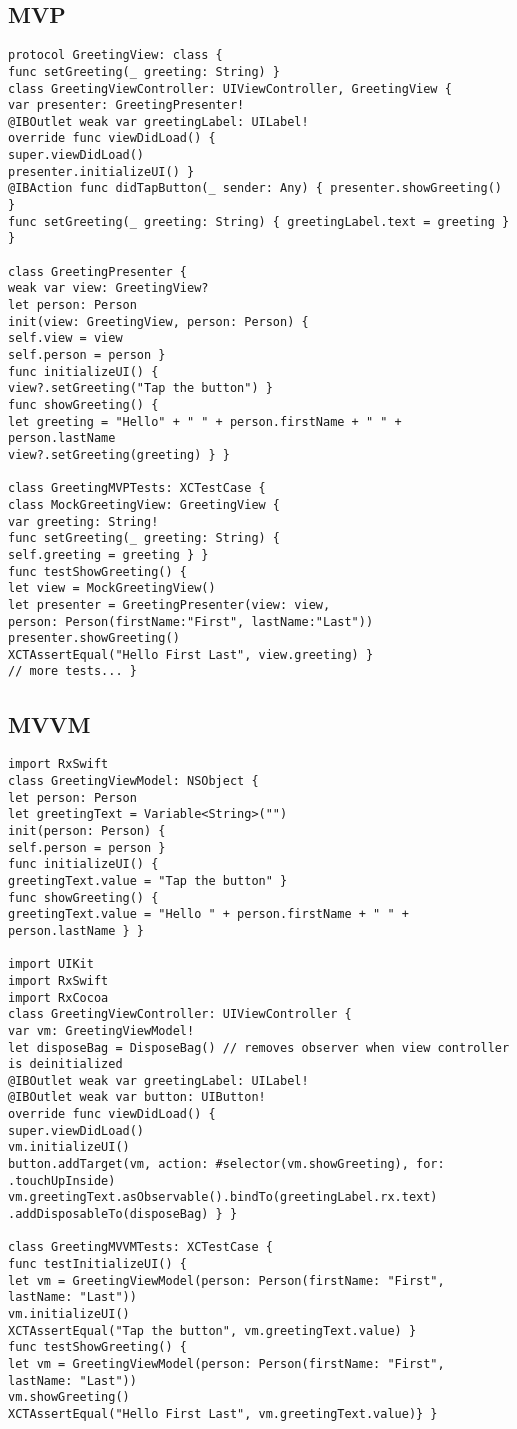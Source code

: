 \subsection{MVP}
\begin{lstlisting}
protocol GreetingView: class {
func setGreeting(_ greeting: String) }
class GreetingViewController: UIViewController, GreetingView {
var presenter: GreetingPresenter!
@IBOutlet weak var greetingLabel: UILabel!
override func viewDidLoad() {
super.viewDidLoad()
presenter.initializeUI() }
@IBAction func didTapButton(_ sender: Any) { presenter.showGreeting() }
func setGreeting(_ greeting: String) { greetingLabel.text = greeting } }

class GreetingPresenter {
weak var view: GreetingView?
let person: Person
init(view: GreetingView, person: Person) {
self.view = view
self.person = person }
func initializeUI() {
view?.setGreeting("Tap the button") }
func showGreeting() {
let greeting = "Hello" + " " + person.firstName + " " + person.lastName
view?.setGreeting(greeting) } }

class GreetingMVPTests: XCTestCase {
class MockGreetingView: GreetingView {
var greeting: String!
func setGreeting(_ greeting: String) {
self.greeting = greeting } }
func testShowGreeting() {
let view = MockGreetingView()
let presenter = GreetingPresenter(view: view,
person: Person(firstName:"First", lastName:"Last"))
presenter.showGreeting()
XCTAssertEqual("Hello First Last", view.greeting) }
// more tests... }
\end{lstlisting}

\subsection{MVVM}
\begin{lstlisting}
import RxSwift
class GreetingViewModel: NSObject {
let person: Person
let greetingText = Variable<String>("")
init(person: Person) {
self.person = person }
func initializeUI() {
greetingText.value = "Tap the button" }
func showGreeting() {
greetingText.value = "Hello " + person.firstName + " " + person.lastName } }

import UIKit
import RxSwift
import RxCocoa
class GreetingViewController: UIViewController {
var vm: GreetingViewModel!
let disposeBag = DisposeBag() // removes observer when view controller is deinitialized
@IBOutlet weak var greetingLabel: UILabel!
@IBOutlet weak var button: UIButton!
override func viewDidLoad() {
super.viewDidLoad()
vm.initializeUI()
button.addTarget(vm, action: #selector(vm.showGreeting), for: .touchUpInside)
vm.greetingText.asObservable().bindTo(greetingLabel.rx.text)
.addDisposableTo(disposeBag) } }

class GreetingMVVMTests: XCTestCase {
func testInitializeUI() {
let vm = GreetingViewModel(person: Person(firstName: "First", lastName: "Last"))
vm.initializeUI()
XCTAssertEqual("Tap the button", vm.greetingText.value) }
func testShowGreeting() {
let vm = GreetingViewModel(person: Person(firstName: "First", lastName: "Last"))
vm.showGreeting()
XCTAssertEqual("Hello First Last", vm.greetingText.value)} }
\end{lstlisting}



